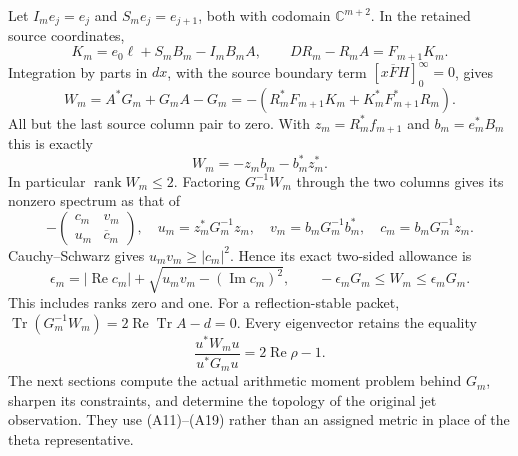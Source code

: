 Let \(I_me_j=e_j\) and \(S_me_j=e_{j+1}\), both with codomain
\(\mathbb C^{m+2}\). In the retained source coordinates,
\[
 K_m=e_0\ell+S_mB_m-I_mB_mA,\qquad
 DR_m-R_mA=F_{m+1}K_m .
 \tag{A16}
\]
Integration by parts in \(dx\), with the source boundary term
\([x\overline FH]_0^\infty=0\), gives
\[
 W_m=A^*G_m+G_mA-G_m
       =-(R_m^*F_{m+1}K_m+K_m^*F_{m+1}^*R_m).
\]
All but the last source column pair to zero.
With \(z_m=R_m^*f_{m+1}\) and \(b_m=e_m^*B_m\) this is exactly
\[
                   W_m=-z_mb_m-b_m^*z_m^* .
 \tag{A17}
\]
In particular \(\operatorname{rank}W_m\leq2\).
Factoring \(G_m^{-1}W_m\) through the two columns gives its nonzero
spectrum as that of
\[
 -\begin{pmatrix}c_m&v_m\\u_m&\overline c_m\end{pmatrix},\quad
 u_m=z_m^*G_m^{-1}z_m,\quad v_m=b_mG_m^{-1}b_m^*,\quad
 c_m=b_mG_m^{-1}z_m.
\]
Cauchy--Schwarz gives \(u_mv_m\geq|c_m|^2\).
Hence its exact two-sided allowance is
\[
 \epsilon_m=|\operatorname{Re}c_m|+
            \sqrt{u_mv_m-(\operatorname{Im}c_m)^2},\qquad
 -\epsilon_mG_m\leq W_m\leq\epsilon_mG_m .
 \tag{A18}
\]
This includes ranks zero and one.
For a reflection-stable packet,
\(\operatorname{Tr}(G_m^{-1}W_m)
=2\operatorname{Re}\operatorname{Tr}A-d=0\).
Every eigenvector retains the equality
\[
        \frac{u^*W_mu}{u^*G_mu}=2\operatorname{Re}\rho-1 .
 \tag{A19}
\]
The next sections compute the actual arithmetic moment problem
behind \(G_m\), sharpen its constraints, and determine the topology
of the original jet observation. They use (A11)--(A19) rather than
an assigned metric in place of the theta representative.

